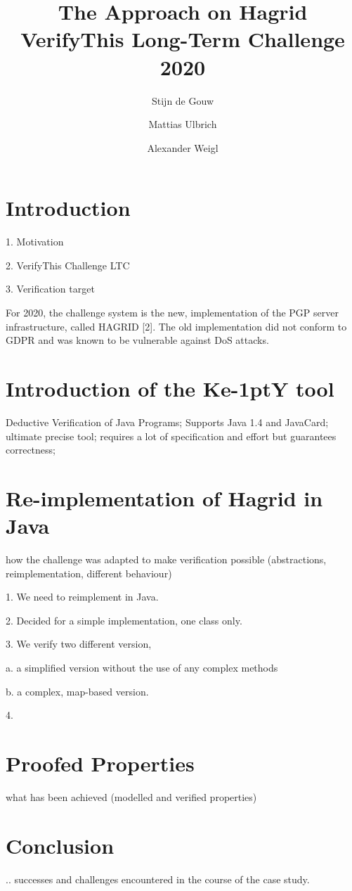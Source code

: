 \documentclass{llncs}
\title{The \KeY Approach on Hagrid
  \\{\small VerifyThis Long-Term Challenge 2020 }}
\author{ Stijn de Gouw \and Mattias Ulbrich \and Alexander Weigl }
\institute{Open University \and Karlsruhe Institute of Technology}
\newcommand{\KeY}{Ke\kern-1ptY\xspace}
\begin{document}
\maketitle

\section{Introduction}

1. Motivation

2. VerifyThis Challenge LTC

3. Verification target 

For 2020, the challenge system is the new, implementation of the PGP server
infrastructure, called HAGRID [2]. The old implementation did not conform to
GDPR and was known to be vulnerable against DoS attacks.
    


\section{Introduction of the \KeY tool}

Deductive Verification of Java Programs; Supports Java 1.4 and JavaCard;
ultimate precise tool; requires a lot of specification and effort but guarantees
correctness;


\section{Re-implementation of Hagrid in Java}

how the challenge was adapted to make verification possible
(abstractions, reimplementation, different behaviour)

1. We need to reimplement in Java.

2. Decided for a simple implementation, one class only.

3. We verify two different version,

a. a simplified version without the use of any complex methods

b. a complex, map-based version.

4. 

\section{Proofed Properties}

what has been achieved (modelled and verified properties)


\section{Conclusion }

.. successes and challenges encountered in the course of the case study.
\end{document}
